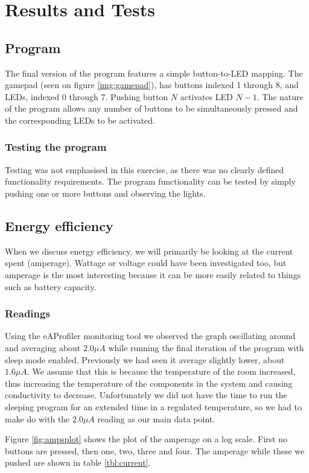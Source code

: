 \chapter{Results and Tests}
\label{chap:results}
\section{Program}
The final version of the program features a simple button-to-LED mapping. The gamepad (seen on figure \ref{img:gamepad}), has buttons indexed 1 through 8, and LEDs, indexed 0 through 7. Pushing button $N$ activates LED $N-1$. The nature of the program allows any number of buttons to be simultaneously pressed and the corresponding LEDs to be activated.

\subsection{Testing the program}
Testing was not emphasised in this exercise, as there was no clearly defined functionality requirements. The program functionality can be tested by simply pushing one or more buttons and observing the lights.

\section{Energy efficiency}
When we discuss energy efficiency, we will primarily be looking at the current spent (amperage). Wattage or voltage could have been investigated too, but amperage is the most interesting because it can be more easily related to things such as battery capacity.

\subsection{Readings}
Using the eAProfiler monitoring tool we observed the graph oscillating around and averaging about $2.0 \mu A$ while running the final iteration of the program with sleep mode enabled. Previously we had seen it average slightly lower, about $1.6 \mu A$. We assume that this is because the temperature of the room increased, thus increasing the temperature of the components in the system and causing conductivity to decrease. Unfortunately we did not have the time to run the sleeping program for an extended time in a regulated temperature, so we had to make do with the $2.0 \mu A$ reading as our main data point.

Figure \ref{fig:ampsplot} shows the plot of the amperage on a log scale. First no buttons are pressed, then one, two, three and four. The amperage while these we pushed are shown in table \ref{tbl:current}.

